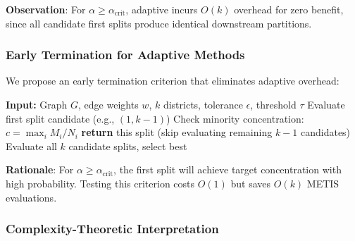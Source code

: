\textbf{Observation}: For $\alpha \geq \alpha_{\text{crit}}$, adaptive incurs $O(k)$ overhead for zero benefit, since all candidate first splits produce identical downstream partitions.

\subsubsection{Early Termination for Adaptive Methods}

We propose an early termination criterion that eliminates adaptive overhead:

\begin{algorithm}[H]
\caption{Adaptive Bisection with Early Termination}
\begin{algorithmic}[1]
\STATE \textbf{Input:} Graph $G$, edge weights $w$, $k$ districts, tolerance $\epsilon$, threshold $\tau$
\STATE Evaluate first split candidate (e.g., $(1, k-1)$)
\STATE Check minority concentration: $c = \max_{i} M_i / N_i$
    \STATE \textbf{return} this split (skip evaluating remaining $k-1$ candidates)
\ELSE
    \STATE Evaluate all $k$ candidate splits, select best
\ENDIF
\end{algorithmic}
\end{algorithm}

\textbf{Rationale}: For $\alpha \geq \alpha_{\text{crit}}$, the first split will achieve target concentration with high probability. Testing this criterion costs $O(1)$ but saves $O(k)$ METIS evaluations.

\subsubsection{Complexity-Theoretic Interpretation}

